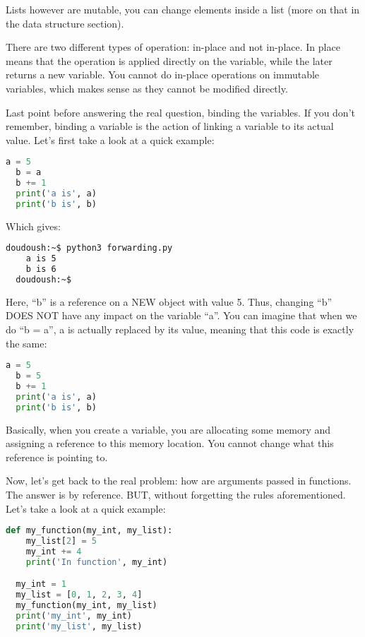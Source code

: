 Lists however are mutable, you can change elements inside a list
(more on that in the data structure section).

\vspace{5mm}

There are two different types of operation: in-place and not in-place.
In place means that the operation is applied directly on the variable, while the later
returns a new variable. You cannot do in-place operations on immutable variables,
which makes sense as they cannot be modified directly.

\vspace{5mm}

Last point before answering the real question, binding the variables. If you don't
remember, binding a variable is the action of linking a variable to its actual value.
Let's first take a look at a quick example:

\begin{lstlisting}[language=python]
  a = 5
  b = a
  b += 1
  print('a is', a)
  print('b is', b)
\end{lstlisting}

Which gives:

\begin{lstlisting}[language=bash]
  doudoush:~$ python3 forwarding.py
    a is 5
    b is 6
  doudoush:~$
\end{lstlisting}

Here, ``b'' is a reference on a NEW object with value 5. Thus, changing ``b'' DOES NOT have any impact
on the variable ``a''. You can imagine that when we do ``b = a'', a is actually replaced by its value,
meaning that this code is exactly the same:

\begin{lstlisting}[language=python]
  a = 5
  b = 5
  b += 1
  print('a is', a)
  print('b is', b)
\end{lstlisting}

Basically, when you create a variable, you are allocating some memory and assigning a reference
to this memory location. You cannot change what this reference is pointing to.

\vspace{5mm}
Now, let's get back to the real problem: how are arguments passed in functions. The answer is by reference.
BUT, without forgetting the rules aforementioned. Let's take a look at a quick example:

\begin{lstlisting}[language=python]
  def my_function(my_int, my_list):
    my_list[2] = 5
    my_int += 4
    print('In function', my_int)

  my_int = 1
  my_list = [0, 1, 2, 3, 4]
  my_function(my_int, my_list)
  print('my_int', my_int)
  print('my_list', my_list)
\end{lstlisting}

